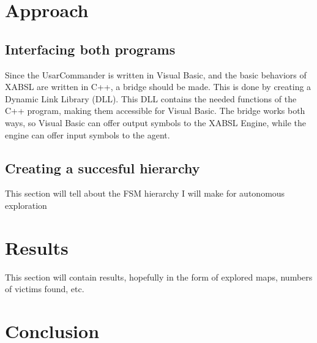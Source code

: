 \documentclass[a4paper,10pt]{article}
\begin{document}
\section{Approach}

\subsection{Interfacing both programs}
Since the UsarCommander is written in Visual Basic, and the basic behaviors of
XABSL are written in C++, a bridge should be made. This is done by creating a
Dynamic Link Library (DLL). This DLL contains the needed functions of the C++
program, making them accessible for Visual Basic. The bridge works both ways, so
Visual Basic can offer output symbols to the XABSL Engine, while the engine can
offer input symbols to the agent.

\subsection{Creating a succesful hierarchy}
This section will tell about the FSM hierarchy I will make for autonomous
exploration


\section{Results}
This section will contain results, hopefully in the form of explored maps, numbers of victims found, etc.

\section{Conclusion}

{}

\end{document}

